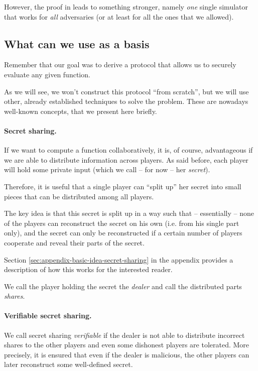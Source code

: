 However, the proof in \cite{Rogaway:1991:RCS:888502} leads to something stronger, namely \emph{one} single simulator that works for \emph{all} adversaries (or at least for all the ones that we allowed).

\subsection{What can we use as a basis}
\label{sec:building-blocks-for-the-protocol}

Remember that our goal was to derive a protocol that allows us to securely evaluate any given function.

As we will see, we won't construct this protocol ``from scratch'', but we will use other, already established techniques to solve the problem. These are nowadays well-known concepts, that we present here briefly.

\paragraph{Secret sharing.}

If we want to compute a function collaboratively, it is, of course, advantageous if we are able to distribute information across players. As said before, each player will hold some private input (which we call -- for now -- her \emph{secret}).

Therefore, it is useful that a single player can ``split up'' her secret into small pieces that can be distributed among all players. 

The key idea is that this secret is split up in a way such that -- essentially -- none of the players can reconstruct the secret on his own (i.e. from his single part only), and the secret can only be reconstructed if a certain number of players cooperate and reveal their parts of the secret. 

Section \ref{sec:appendix-basic-idea-secret-sharing} in the appendix provides a description of how this works for the interested reader.

We call the player holding the secret the \emph{dealer} and call the distributed parts \emph{shares}.

\paragraph{Verifiable secret sharing.}

We call secret sharing \emph{verifiable} if the dealer is not able to distribute incorrect shares to the other players and even some dishonest players are tolerated. More precisely, it is ensured that even if the dealer is malicious, the other players can later reconstruct some well-defined secret.

